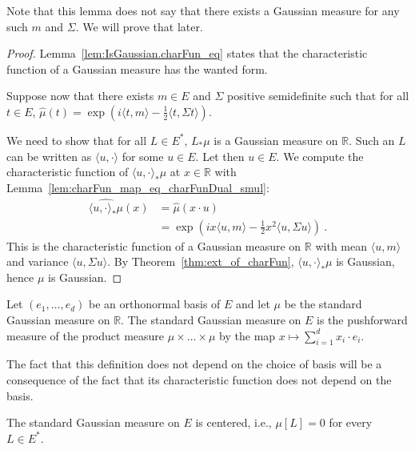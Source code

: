 Note that this lemma does not say that there exists a Gaussian measure for any such $m$ and $\Sigma$.
We will prove that later.

\begin{proof}
Lemma~\ref{lem:IsGaussian.charFun_eq} states that the characteristic function of a Gaussian measure has the wanted form.

Suppose now that there exists $m \in E$ and $\Sigma$ positive semidefinite such that for all $t \in E$, $\hat{\mu}(t) = \exp\left(i \langle t, m \rangle - \frac{1}{2} \langle t, \Sigma t \rangle\right)$.

We need to show that for all $L \in E^*$, $L_*\mu$ is a Gaussian measure on $\mathbb{R}$.
Such an $L$ can be written as $\langle u, \cdot \rangle$ for some $u \in E$.
Let then $u \in E$. We compute the characteristic function of $\langle u, \cdot\rangle_*\mu$ at $x \in \mathbb{R}$ with Lemma~\ref{lem:charFun_map_eq_charFunDual_smul}:
\begin{align*}
  \widehat{\langle u, \cdot\rangle_*\mu}(x)
  &= \hat{\mu}(x \cdot u)
  \\
  &= \exp\left(i x \langle u, m \rangle - \frac{1}{2} x^2 \langle u, \Sigma u \rangle\right)
  \: .
\end{align*}
This is the characteristic function of a Gaussian measure on $\mathbb{R}$ with mean $\langle u, m \rangle$ and variance $\langle u, \Sigma u \rangle$.
By Theorem~\ref{thm:ext_of_charFun}, $\langle u, \cdot\rangle_*\mu$ is Gaussian, hence $\mu$ is Gaussian.
\end{proof}


\begin{definition}\label{def:stdGaussian}
  \leanok
Let $(e_1, \ldots, e_d)$ be an orthonormal basis of $E$ and let $\mu$ be the standard Gaussian measure on $\mathbb{R}$.
The standard Gaussian measure on $E$ is the pushforward measure of the product measure $\mu \times \ldots \times \mu$ by the map $x \mapsto \sum_{i=1}^d x_i \cdot e_i$.
\end{definition}

The fact that this definition does not depend on the choice of basis will be a consequence of the fact that its characteristic function does not depend on the basis.

\begin{lemma}\label{lem:isCentered_stdGaussian}
The standard Gaussian measure on $E$ is centered, i.e., $\mu[L] = 0$ for every $L \in E^*$.
\end{lemma}

